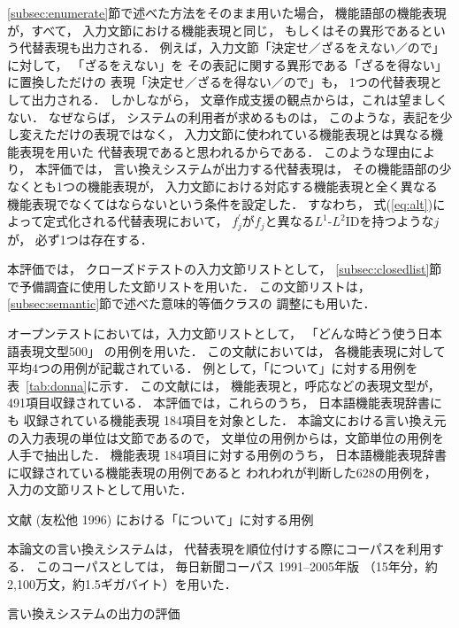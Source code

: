 \documentclass[japanese]{jnlp_1.4}
\begin{document}
\ref{subsec:enumerate}節で述べた方法をそのまま用いた場合，
機能語部の機能表現が，すべて，
入力文節における機能表現と同じ，
もしくはその異形であるという代替表現も出力される．
例えば，入力文節「決定せ／ざるをえない／ので」に対して，
「ざるをえない」を
その表記に関する異形である「ざるを得ない」に置換しただけの
表現「決定せ／ざるを得ない／ので」も，
1つの代替表現として出力される．
しかしながら，
文章作成支援の観点からは，これは望ましくない．
なぜならば，
システムの利用者が求めるものは，
このような，表記を少し変えただけの表現ではなく，
入力文節に使われている機能表現とは異なる機能表現を用いた
代替表現であると思われるからである．
このような理由により，
本評価では，
言い換えシステムが出力する代替表現は，
その機能語部の少なくとも1つの機能表現が，
入力文節における対応する機能表現と全く異なる
機能表現でなくてはならないという条件を設定した．
すなわち，
式(\ref{eq:alt})によって定式化される代替表現において，
$f_j^\prime$が$f_j$と異なる$L^1$-$L^2$IDを持つような$j$が，
必ず1つは存在する．

本評価では，
クローズドテストの入力文節リストとして，
\ref{subsec:closedlist}節で予備調査に使用した文節リストを用いた．
この文節リストは，
\ref{subsec:semantic}節で述べた意味的等価クラスの
調整にも用いた．

オープンテストにおいては，入力文節リストとして，
「どんな時どう使う日本語表現文型500」
の用例を用いた．
この文献においては，
各機能表現に対して平均4つの用例が記載されている．
例として，「について」に対する用例を表~\ref{tab:donna}に示す．
この文献には，
機能表現と，呼応などの表現文型が，491項目収録されている．
本評価では，これらのうち，
日本語機能表現辞書にも
収録されている機能表現 184項目を対象とした．
本論文における言い換え元の入力表現の単位は文節であるので，
文単位の用例からは，文節単位の用例を人手で抽出した．
機能表現 184項目に対する用例のうち，
日本語機能表現辞書に収録されている機能表現の用例であると
われわれが判断した628の用例を，
入力の文節リストとして用いた．

\begin{table}[b]
    \caption{文献 (友松他 1996) における「について」に対する用例}
\label{tab:donna}

\end{table}

本論文の言い換えシステムは，
代替表現を順位付けする際にコーパスを利用する．
このコーパスとしては，
毎日新聞コーパス 1991--2005年版
（15年分，約2,100万文，約1.5ギガバイト）を用いた．


\begin{table}[b]
\caption{言い換えシステムの出力の評価}
\label{tab:evaluation}

\end{table}
\end{document}
